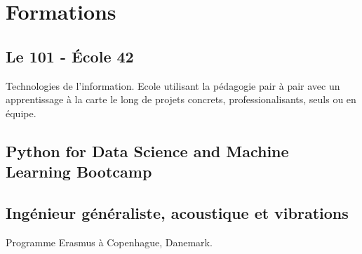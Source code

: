 \documentclass{article}
\begin{document}
\section{Formations}
\subsection{Le 101 - \'Ecole 42}
Technologies de l'information.
Ecole utilisant la p\'edagogie pair \`a pair avec un apprentissage \`a la carte le long de projets concrets, professionalisants, seuls ou en \'equipe.
\subsection{Python for Data Science and Machine Learning Bootcamp}
\subsection{Ing\'enieur g\'en\'eraliste, acoustique et vibrations}
Programme Erasmus \`a Copenhague, Danemark.
\end{document}
